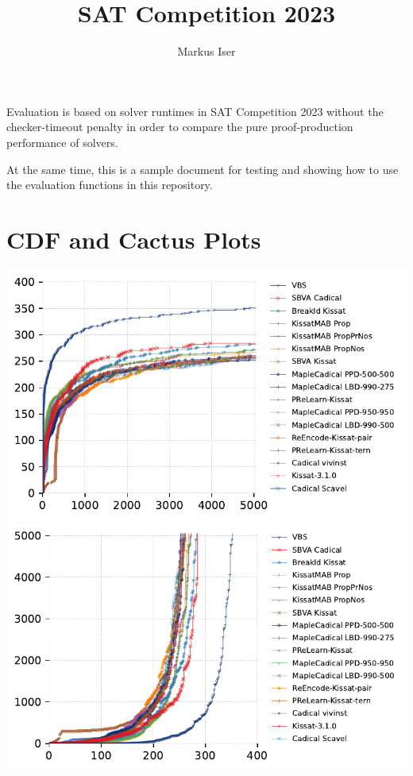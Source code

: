 \documentclass{article}
\date{}
\title{SAT Competition 2023}
\author{Markus Iser}
\begin{document}
\maketitle

Evaluation is based on solver runtimes in SAT Competition 2023 without the checker-timeout penalty 
in order to compare the pure proof-production performance of solvers.

At the same time, this is a sample document for testing and showing 
how to use the evaluation functions in this repository.

\section{CDF and Cactus Plots}

\includegraphics{gen/sc2023/cdf.pdf}
\includegraphics{gen/sc2023/cactus.pdf}
\end{document}

